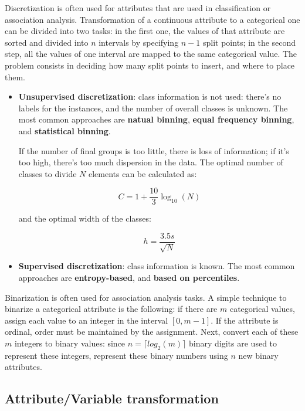 Discretization is often used for attributes that are used in classification or association analysis. Transformation of a continuous attribute to a categorical one can be divided into two tasks: in the first one, the values of that attribute are sorted and divided into $n$ intervals by specifying $n-1$ split points; in the second step, all the values of one interval are mapped to the same categorical value. The problem consists in deciding how many split points to insert, and where to place them.
\begin{itemize}
    \item \textbf{Unsupervised discretization}: class information is not used: there's no labels for the instances, and the number of overall classes is unknown. The most common approaches are \textbf{natual binning}, \textbf{equal frequency binning}, and \textbf{statistical binning}.

    If the number of final groups is too little, there is loss of information; if it's too high, there's too much dispersion in the data. The optimal number of classes to divide $N$ elements can be calculated as:

    \begin{equation*}
        C = 1 + \dfrac{10}{3}\log_{10}(N)
    \end{equation*}

    and the optimal width of the classes:

    \begin{equation*}
        h = \dfrac{3.5 s}{\sqrt{N}}
    \end{equation*}

    \item \textbf{Supervised discretization}: class information is known. The most common approaches are \textbf{entropy-based}, and \textbf{based on percentiles}.
\end{itemize}

Binarization is often used for association analysis tasks. A simple technique to binarize a categorical attribute is the following: if there are $m$ categorical values, assign each value to an integer  in the interval $[0, m-1]$. If the attribute is ordinal, order must be maintained by the assignment. Next, convert each of these $m$ integers to binary values: since $n = \lceil log_2(m) \rceil$ binary digits are used to represent these integers, represent these binary numbers using $n$ new binary attributes.

\subsection{Attribute/Variable transformation}


